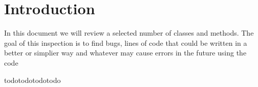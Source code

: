 \section{Introduction}
	
In this document we will review a selected number of classes and methods.
The goal of this inspection is to find bugs, lines of code that could be written in a better or simplier way and whatever may cause errors in the future using the code


todotodotodotodo
